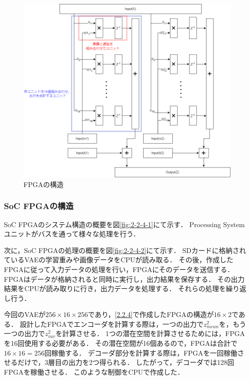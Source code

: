 \documentclass[paper]{ieicej}
\begin{document}
\begin{figure}[tb]
  \begin{center}
    \includegraphics[width=0.98\columnwidth]{figures/FPGA_1.png}
  \end{center}
  \caption{FPGAの構造}
  \label{fig:2-2-3-1}
\end{figure}

\subsubsection{SoC FPGAの構造}\label{2.2.5}
SoC FPGAのシステム構造の概要を図\ref{fig:2-2-4-1}にて示す．
Processing Systemユニットがバスを通って様々な処理を行う．

次に，SoC FPGAの処理の概要を図\ref{fig:2-2-4-2}にて示す．
SDカードに格納されているVAEの学習重みや画像データをCPUが読み取る．
その後，作成したFPGAに従って入力データの処理を行い，FPGAにそのデータを送信する．
FPGAはデータが格納されると同時に実行し，出力結果を保存する．
その出力結果をCPUが読み取りに行き，出力データを処理する．
それらの処理を繰り返し行う．

今回のVAEが$256\times16\times256$であり，\ref{2.2.4}で作成したFPGAの構造が$16\times2$である．
設計したFPGAでエンコーダを計算する際は，一つの出力で$z^2_{mean}$を，もう一つの出力で$z^2_{var}$を計算させる．
1つの潜在空間を計算させるためには，FPGAを16回使用する必要がある．
その潜在空間が16個あるので，FPGAは合計で$16\times16=256$回稼働する．
デコーダ部分を計算する際は，FPGAを一回稼働させるだけで，3層目の出力を2つ得られる．
したがって，デコーダでは128回FPGAを稼働させる．
このような制御をCPUで作成した．
\end{document}

